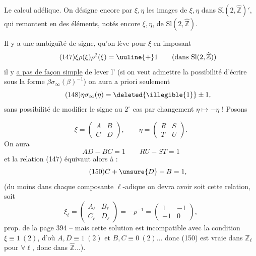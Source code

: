 
Le calcul adélique. On désigne encore par $\xi,\eta$ les images de $\xi,\eta$ dans $\mathrm{Sl}(2,\widehat{\mathbb Z})'$, qui remontent en des éléments, notés encore $\xi,\eta$, de $\mathrm{Sl}(2,\widehat{\mathbb Z})$.

Il y a une ambiguïté de signe, qu'on lève pour $\xi$ en imposant
\[
\tag{147}
\xi\rho(\xi)\rho^2(\xi)=\uuline{+}1
\qquad(\text{dans }\mathrm{Sl}(2,\widehat{\mathbb Z}))
\]
 il y \uline{a pas de façon simple} de lever l' (si on veut admettre  la possibilité d'écrire sous la forme $\beta\sigma_\infty(\beta)^{-1}$) \uline{} on aura a priori seulement
\[
\tag{148}
\eta\sigma_\infty(\eta)=\deleted{\illegible{1}}\pm1,
\]
sans possibilité de modifier le signe au $2^\circ$ cas par changement $\eta\mapsto-\eta$ ! Posons


\[
\tag{148}
\xi=\begin{pmatrix}A&B\\C&D\end{pmatrix},\qquad
\eta=\begin{pmatrix}R&S\\T&U\end{pmatrix}.
\]
On aura
\[
\tag{149}
AD-BC=1\qquad RU-ST=1
\]
et la relation (147) équivaut alors à :
\[
\tag{150}
C+\unsure{D}-B=1,
\]
 (du moins dans chaque composante $\ell$-adique on devra avoir soit cette relation, soit
\[
\xi_\ell=\begin{pmatrix}A_\ell&B_\ell\\C_\ell&D_\ell\end{pmatrix}
=-\rho^{-1}=\begin{pmatrix}1&-1\\-1&0\end{pmatrix},
\]
 prop. de la page 394 -- mais cette solution est incompatible avec la condition $\boxed{\xi\equiv1\ (2)}$, d'où $A,D\equiv1\ (2)$ et $B,C\equiv0\ (2)\ldots$ donc (150) est vraie dans $\mathbb Z_\ell$ pour $\forall\ell$, donc dans $\widehat{\mathbb Z}\ldots$).



